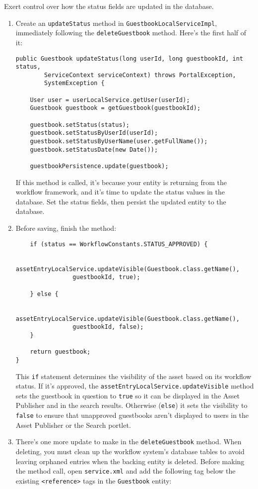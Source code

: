 Exert control over how the status fields are updated in the database.

\begin{enumerate}
\def\labelenumi{\arabic{enumi}.}
\item
  Create an \texttt{updateStatus} method in
  \texttt{GuestbookLocalServiceImpl}, immediately following the
  \texttt{deleteGuestbook} method. Here's the first half of it:

\begin{verbatim}
public Guestbook updateStatus(long userId, long guestbookId, int status,
        ServiceContext serviceContext) throws PortalException,
        SystemException {

    User user = userLocalService.getUser(userId);
    Guestbook guestbook = getGuestbook(guestbookId);

    guestbook.setStatus(status);
    guestbook.setStatusByUserId(userId);
    guestbook.setStatusByUserName(user.getFullName());
    guestbook.setStatusDate(new Date());

    guestbookPersistence.update(guestbook);
\end{verbatim}

  If this method is called, it's because your entity is returning from
  the workflow framework, and it's time to update the status values in
  the database. Set the status fields, then persist the updated entity
  to the database.
\item
  Before saving, finish the method:

\begin{verbatim}
    if (status == WorkflowConstants.STATUS_APPROVED) {

        assetEntryLocalService.updateVisible(Guestbook.class.getName(),
                guestbookId, true);

    } else {

        assetEntryLocalService.updateVisible(Guestbook.class.getName(),
                guestbookId, false);
    }

    return guestbook;
}
\end{verbatim}

  This \texttt{if} statement determines the visibility of the asset
  based on its workflow status. If it's approved, the
  \texttt{assetEntryLocalService.updateVisible} method sets the
  guestbook in question to \texttt{true} so it can be displayed in the
  Asset Publisher and in the search results. Otherwise (\texttt{else})
  it sets the visibility to \texttt{false} to ensure that unapproved
  guestbooks aren't displayed to users in the Asset Publisher or the
  Search portlet.
\item
  There's one more update to make in the \texttt{deleteGuestbook}
  method. When deleting, you must clean up the workflow system's
  database tables to avoid leaving orphaned entries when the backing
  entity is deleted. Before making the method call, open
  \texttt{service.xml} and add the following tag below the existing
  \texttt{\textless{}reference\textgreater{}} tags in the
  \texttt{Guestbook} entity:


\end{enumerate}
